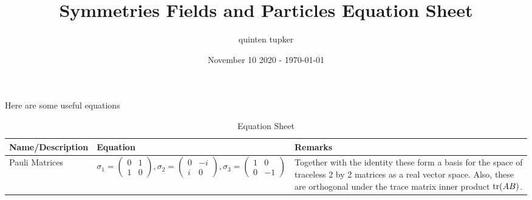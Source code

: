 \documentclass{article}
\title{Symmetries Fields and Particles Equation Sheet}
\author{quinten tupker}
\date{November 10 2020 - \today}
\theoremstyle{definition}
\begin{document}
\maketitle

Here are some useful equations

\begin{table}[H]
  \caption{Equation Sheet}
  \begin{adjustbox}{center}
    \begin{tabular}{|p{5cm}|p{10cm}|p{5cm}|}
      \hline
      \label{equations_1}
      Name/Description & Equation & Remarks \\ \hline
      Pauli Matrices & $\sigma_1 = \begin{pmatrix} 0 & 1 \\ 1 & 0 \end{pmatrix}, \sigma_2 = \begin{pmatrix} 0 & -i \\ i & 0 \end{pmatrix}, \sigma_3 = \begin{pmatrix} 1 & 0 \\ 0 & -1 \end{pmatrix}$ & Together with the identity these form a basis for the space of traceless 2 by 2 matrices as a real vector space. Also, these are orthogonal under the trace matrix inner product $\tr(AB)$. \\ \hline
    \end{tabular}
  \end{adjustbox}
\end{table}
\end{document}
